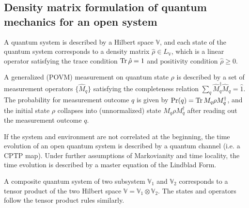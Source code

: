 \subsection{Density matrix formulation of quantum mechanics for an open system}

\begin{pos}
    A quantum system is described by a Hilbert space $\mathbb{V}$, and each state of the quantum system corresponds to a density matrix $\hat\rho\in L_\mathbb{V}$, which is a linear operator satisfying the trace condition $\operatorname{Tr}\hat\rho=1$ and positivity condition $\hat\rho\geq0$. 
\end{pos}

\begin{pos}
    A generalized (POVM) measurement on quantum state $\rho$ is described by a set of measurement operators $\{\hat M_q\}$ satisfying the completeness relation $\sum_q\hat M^\dagger_q\hat M_q=\hat1$. The probability for measurement outcome $q$ is given by $\text{Pr}(q)=\operatorname{Tr}{M_q\rho M_q^\dagger}$, and the initial state $\rho$ collapses into  (unnormalized) state $M_q\rho M_q^\dagger$ after reading out the measurement outcome $q$. 
\end{pos}


\begin{pos}
    If the system and environment are not correlated at the beginning, the time evolution of an open quantum system is described by a quantum channel (i.e. a CPTP map). Under further assumptions of Markovianity and time locality, the time evolution is described by a master equation of the Lindblad Form. 
\end{pos}

\begin{pos}
    A composite quantum system of two subsystem $\mathbb{V}_1$ and $\mathbb{V}_2$ corresponds to a tensor product of the two Hilbert space $\mathbb{V}=\mathbb{V}_1\otimes \mathbb{V}_2$. The states and operators follow the tensor product rules similarly. 
\end{pos}